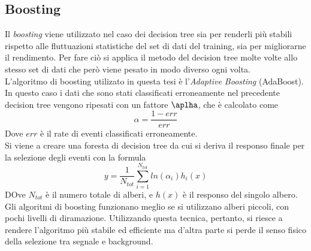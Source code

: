    \subsection{Boosting}
    Il \textit{boosting} viene utilizzato nel caso dei decision tree sia per renderli più stabili rispetto alle fluttuazioni statistiche del set di dati del training, sia per migliorarne il rendimento. Per fare ciò si applica il metodo del decision tree molte volte allo stesso set di dati che però viene pesato in modo diverso ogni volta. 
    \\L'algoritmo di boosting utilizato in questa tesi è l'\textit{Adaptive Boosting} (AdaBoost). In questo caso i dati che sono stati classificati erroneamente nel precedente decision tree vengono ripesati con un fattore $\aplha$, che è calcolato come 
        \begin{equation}
            \alpha = \frac{1 - err}{err}
        \end{equation}
    Dove $err$ è il rate di eventi classificati erroneamente. 
    \\Si viene a creare una foresta di decision tree da cui si deriva il responso finale per la selezione degli eventi con la formula 
        \begin{equation}
            y = \frac{1}{N_{tot}} \sum_{i=1}^{N_{tot}} {ln(\alpha_i) h_i(x)}
        \end{equation}
    DOve $N_{tot}$ è il numero totale di alberi, e $h(x)$ è il responso del singolo albero.
    Gli algoritmi di boosting funzionano meglio se si utilizzano alberi piccoli, con pochi livelli di diramazione.
    Utilizzando questa tecnica, pertanto, si riesce a rendere l'algoritmo più stabile ed efficiente ma d'altra parte si perde il senso fisico della selezione tra segnale e background.
    
    
    
    
